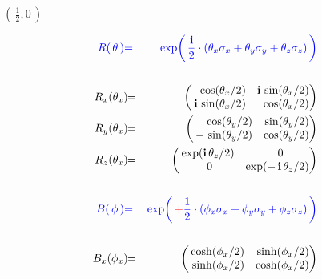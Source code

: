 \begin{frame}{\headingColor\bf\LARGE}

\scriptsize

\begin{multicols}{2}

	\begin{minipage}{7cm}
	\begin{center}
	\vskip -1cm
	\textbf{\Large$\left(\,\frac{1}{2},0\,\right)$}
	\end{center}
	\vskip -0.3cm
	\begin{eqnarray*}
	{\color{blue}R(\,\mathbf{\theta}\,)}
	& {\color{blue}=} &
		{\color{blue}\exp\!\left(\,\frac{\i}{2}\cdot(\theta_{x}\sigma_{x}+\theta_{y}\sigma_{y}+\theta_{z}\sigma_{z})\,\right)}
	\\ \\
	R_{x}(\theta_{x})\!\!
	& = &
		\!\!\left(\!\!\begin{array}{rr} \cos(\theta_{x}/2) & \i\,\sin(\theta_{x}/2) \\ \i\,\sin(\theta_{x}/2) & \cos(\theta_{x}/2) \end{array}\!\!\!\right)
	\\
	R_{y}(\theta_{x})\!\!
	& = &
		\!\!\left(\!\!\begin{array}{rr} \cos(\theta_{y}/2) & \sin(\theta_{y}/2) \\ -\,\sin(\theta_{y}/2) & \cos(\theta_{y}/2) \end{array}\!\!\!\right)
	\\
	R_{z}(\theta_{x})\!\!
	& = &
		\!\!\left(\!\!\begin{array}{cc} \exp(\i\,\theta_{z}/2) & {\color{white}..}0 \\ {\color{white}.}0 & \exp(-\,\i\,\theta_{z}/2) \end{array}\!\!\!\right)
	\\ \\
	{\color{blue}B(\,\mathbf{\phi}\,)}
	& {\color{blue}=} &
		{\color{blue}\exp\!\left(\,{\color{red}+}\frac{1}{2}\cdot(\phi_{x}\sigma_{x}+\phi_{y}\sigma_{y}+\phi_{z}\sigma_{z})\,\right)}
	\\ \\
	B_{x}(\phi_{x})\!\!
	& = &
		\!\!\left(\!\!\begin{array}{rr} \cosh(\phi_{x}/2) & \sinh(\phi_{x}/2) \\ \sinh(\phi_{x}/2) & \cosh(\phi_{x}/2) \end{array}\!\!\!\right)

\end{eqnarray*}
\end{minipage}
\end{multicols}
\end{frame}
